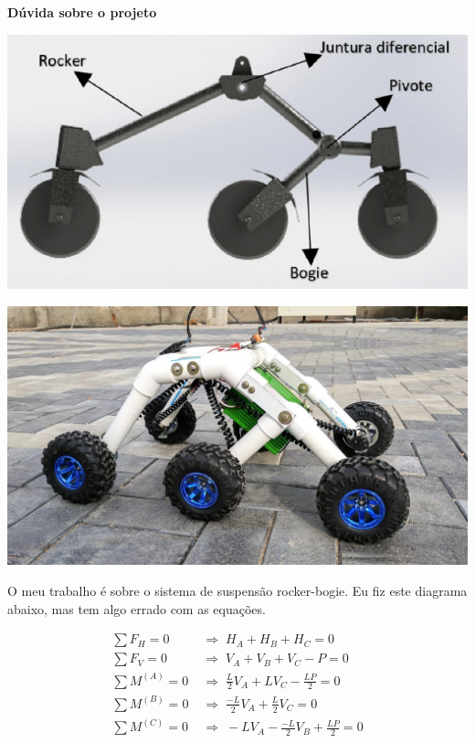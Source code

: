 \documentclass[12pt]{article}
\begin{document}
\textbf{Dúvida sobre o projeto}

\hspace{10cm}

\begin{minipage}{.45\textwidth}
  \includegraphics[width=\textwidth]{fig/rb-suspension.png}
\end{minipage}%
\begin{minipage}{.45\textwidth}
  \includegraphics[width=\textwidth]{fig/rb.jpg}
\end{minipage}

\hspace{4cm}

O meu trabalho é sobre o sistema de suspensão rocker-bogie. Eu fiz este diagrama abaixo, mas tem algo errado com as equações.

\hspace{4cm}

\begin{figure}[h!]
  
\end{figure}

\begin{align*}
  \sum F_H = 0 \;&\Rightarrow\; H_A + H_B + H_C = 0\\
  \sum F_V = 0 \;&\Rightarrow\; V_A + V_B + V_C - P = 0\\
  \sum M^{(A)} = 0 \;&\Rightarrow\; \frac{L}{2}V_A + LV_C - \frac{LP}{2} = 0\\
  \sum M^{(B)} = 0 \;&\Rightarrow\; \frac{-L}{2}V_A + \frac{L}{2}V_C = 0\\
  \sum M^{(C)} = 0 \;&\Rightarrow\; -LV_A - \frac{-L}{2}V_B + \frac{LP}{2} = 0\\
\end{align*}
\end{document}
